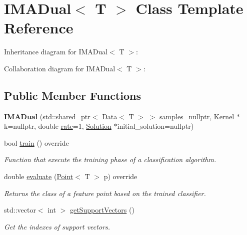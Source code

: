 \hypertarget{class_i_m_a_dual}{}\section{I\+M\+A\+Dual$<$ T $>$ Class Template Reference}
\label{class_i_m_a_dual}


Inheritance diagram for I\+M\+A\+Dual$<$ T $>$\+:


Collaboration diagram for I\+M\+A\+Dual$<$ T $>$\+:
\subsection*{Public Member Functions}
\begin{DoxyCompactItemize}
\item 
\mbox{\label{class_i_m_a_dual_a22a5cf72fe88fd8bb846cf1b5758d61c}} 
{\bfseries I\+M\+A\+Dual} (std\+::shared\+\_\+ptr$<$ \mbox{\hyperlink{class_data}{Data}}$<$ T $>$ $>$ \mbox{\hyperlink{class_classifier_a0000b47a2e0784ada4c52d7046c4adb8}{samples}}=nullptr, \mbox{\hyperlink{class_kernel}{Kernel}} $\ast$k=nullptr, double \mbox{\hyperlink{class_classifier_a7b1c4ef87631bd9e46682e5bc4315111}{rate}}=1, \mbox{\hyperlink{class_solution}{Solution}} $\ast$initial\+\_\+solution=nullptr)
\item 
bool \mbox{\hyperlink{class_i_m_a_dual_aff820af6454ceeef4d23af48476d7218}{train}} () override
\begin{DoxyCompactList}\small\item\em Function that execute the training phase of a classification algorithm. \end{DoxyCompactList}\item 
double \mbox{\hyperlink{class_i_m_a_dual_af67dfc75554d055cfdf761ee940243d7}{evaluate}} (\mbox{\hyperlink{class_point}{Point}}$<$ T $>$ p) override
\begin{DoxyCompactList}\small\item\em Returns the class of a feature point based on the trained classifier. \end{DoxyCompactList}\item 
std\+::vector$<$ int $>$ \mbox{\hyperlink{class_i_m_a_dual_aa8e4e1d6e34c2e67d752c6b5f111ce35}{get\+Support\+Vectors}} ()
\begin{DoxyCompactList}\small\item\em Get the indexes of support vectors. \end{DoxyCompactList}\end{DoxyCompactItemize}
